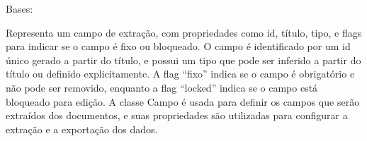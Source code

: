 \documentclass[letterpaper,10pt,english]{sphinxmanual}
\begin{document}
\begin{fulllineitems}
\label{\detokenize{api/models:models.Campo}}
\pysigstartsignatures
\pysiglinewithargsret
{}
{\sphinxparamcomma {}\sphinxparamcomma {}\sphinxparamcomma {}\sphinxparamcomma {}}
{}
\pysigstopsignatures
\sphinxAtStartPar
Bases: 

\sphinxAtStartPar
Representa um campo de extração, com propriedades como id, título, tipo, e flags para indicar se o campo é fixo ou bloqueado. O campo é identificado por um id único gerado a partir do título, e possui um tipo que pode ser inferido a partir do título ou definido explicitamente. A flag “fixo” indica se o campo é obrigatório e não pode ser removido, enquanto a flag “locked” indica se o campo está bloqueado para edição. A classe Campo é usada para definir os campos que serão extraídos dos documentos, e suas propriedades são utilizadas para configurar a extração e a exportação dos dados.

\begin{fulllineitems}
\label{\detokenize{api/models:models.Campo.id}}
\pysigstartsignatures
\pysigline
{}
\pysigstopsignatures
\end{fulllineitems}


\begin{fulllineitems}
\label{\detokenize{api/models:models.Campo.titulo}}
\pysigstartsignatures
\pysigline
{}
\pysigstopsignatures
\end{fulllineitems}


\begin{fulllineitems}
\label{\detokenize{api/models:models.Campo.tipo}}
\pysigstartsignatures
\pysigline
{}
\pysigstopsignatures
\end{fulllineitems}


\end{fulllineitems}
\end{document}
